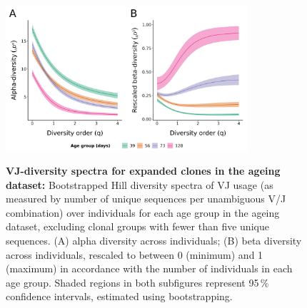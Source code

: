 \begin{figure}
\centering
\includegraphics[width = 0.8\textwidth]{_Figures/png/ageing-VJ-diversity-vlarge-alpha-beta}
\begin{subfigure}{0em}
\label{fig:igseq-ageing-VJ-diversity-large-alpha}
\end{subfigure}
\begin{subfigure}{0em}
\label{fig:igseq-ageing-VJ-diversity-large-beta}
\end{subfigure}
\caption[VJ-diversity spectra for large clones in the \igseq ageing dataset]{\textbf{VJ-diversity spectra for expanded clones in the \igseq ageing dataset:} Bootstrapped Hill diversity spectra of VJ usage (as measured by number of unique sequences per unambiguous V/J combination) over individuals for each age group in the \igseq ageing dataset, excluding clonal groups with fewer than five unique sequences. (A) alpha diversity across individuals; (B) beta diversity across individuals, rescaled to between 0 (minimum) and 1 (maximum) in accordance with the number of individuals in each age group. Shaded regions in both subfigures represent 95\,\% confidence intervals, estimated using bootstrapping.}
\label{fig:igseq-ageing-VJ-diversity-large-spectra}
\end{figure}

